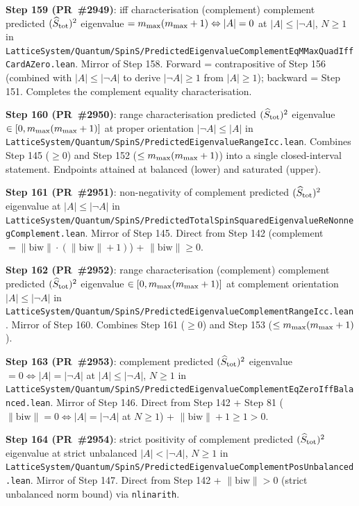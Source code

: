 \documentclass[a4paper,11pt]{article}
\begin{document}
\textbf{Step 159 (PR~\#2949)}: iff characterisation (complement)
complement predicted $(\widehat S_{\rm tot})^2$ eigenvalue
$= m_{\rm max}(m_{\rm max}+1) \Leftrightarrow |A| = 0$ at
$|A| \le |\neg A|$, $N \ge 1$ in
\texttt{LatticeSystem/Quantum/SpinS/PredictedEigenvalueComplementEqMMaxQuadIffCardAZero.lean}.
Mirror of Step 158. Forward = contrapositive of Step 156 (combined
with $|A| \le |\neg A|$ to derive $|\neg A| \ge 1$ from $|A| \ge 1$);
backward = Step 151. Completes the complement equality
characterisation.

\textbf{Step 160 (PR~\#2950)}: range characterisation predicted
$(\widehat S_{\rm tot})^2$ eigenvalue
$\in [0, m_{\rm max}(m_{\rm max}+1)]$ at proper orientation
$|\neg A| \le |A|$ in
\texttt{LatticeSystem/Quantum/SpinS/PredictedEigenvalueRangeIcc.lean}.
Combines Step 145 ($\ge 0$) and Step 152 ($\le m_{\rm max}(m_{\rm max}+1)$)
into a single closed-interval statement. Endpoints attained at
balanced (lower) and saturated (upper).

\textbf{Step 161 (PR~\#2951)}: non-negativity of complement predicted
$(\widehat S_{\rm tot})^2$ eigenvalue at $|A| \le |\neg A|$ in
\texttt{LatticeSystem/Quantum/SpinS/PredictedTotalSpinSquaredEigenvalueReNonnegComplement.lean}.
Mirror of Step 145. Direct from Step 142
(complement $= \|\mathrm{biw}\|\cdot(\|\mathrm{biw}\|+1)$) +
$\|\mathrm{biw}\| \ge 0$.

\textbf{Step 162 (PR~\#2952)}: range characterisation (complement)
complement predicted $(\widehat S_{\rm tot})^2$ eigenvalue
$\in [0, m_{\rm max}(m_{\rm max}+1)]$ at complement orientation
$|A| \le |\neg A|$ in
\texttt{LatticeSystem/Quantum/SpinS/PredictedEigenvalueComplementRangeIcc.lean}.
Mirror of Step 160. Combines Step 161 ($\ge 0$) and Step 153
($\le m_{\rm max}(m_{\rm max}+1)$).

\textbf{Step 163 (PR~\#2953)}: complement predicted $(\widehat S_{\rm tot})^2$
eigenvalue $= 0 \Leftrightarrow |A| = |\neg A|$ at $|A| \le |\neg A|$,
$N \ge 1$ in
\texttt{LatticeSystem/Quantum/SpinS/PredictedEigenvalueComplementEqZeroIffBalanced.lean}.
Mirror of Step 146. Direct from Step 142 + Step 81
($\|\mathrm{biw}\| = 0 \Leftrightarrow |A|=|\neg A|$ at $N \ge 1$) +
$\|\mathrm{biw}\| + 1 \ge 1 > 0$.

\textbf{Step 164 (PR~\#2954)}: strict positivity of complement
predicted $(\widehat S_{\rm tot})^2$ eigenvalue at strict unbalanced
$|A| < |\neg A|$, $N \ge 1$ in
\texttt{LatticeSystem/Quantum/SpinS/PredictedEigenvalueComplementPosUnbalanced.lean}.
Mirror of Step 147. Direct from Step 142 + $\|\mathrm{biw}\| > 0$
(strict unbalanced norm bound) via \texttt{nlinarith}.
\end{document}
